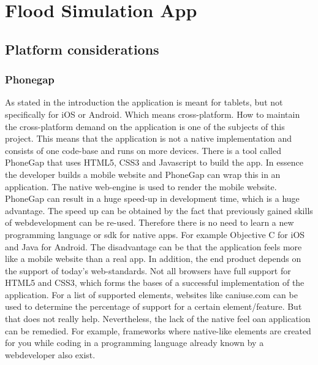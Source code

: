 \section{Flood Simulation App}
\subsection{Platform considerations}
\subsubsection{Phonegap}
As stated in the introduction the application is meant for tablets, but not specifically for iOS or Android. Which means cross-platform. How to maintain the cross-platform demand on the application is one of the subjects of this project. This means that the application is not a native implementation and consists of one code-base and runs on more devices. There is a tool called PhoneGap \cite{PhoneGap} that uses HTML5\cite{HTML5}, CSS3\cite{C3} and Javascript to build the app. In essence the developer builds a mobile website and PhoneGap can wrap this in an application. The native web-engine is used to render the mobile website. PhoneGap can result in a huge speed-up in development time, which is a huge advantage. The speed up can be obtained by the fact that previously gained skills of webdevelopment can be re-used. Therefore there is no need to learn a new programming language or sdk\cite{SDK} for native apps. For example Objective C for iOS and Java for Android. The disadvantage can be that the application feels more like a mobile website than a real app. In addition, the end product depends on the support of today's web-standards. Not all browsers have full support for HTML5 and CSS3, which forms the bases of a successful implementation of the application. For a list of supported elements, websites like caniuse.com \cite{CSS3} can be used to determine the percentage of support for a certain element/feature. But that does not really help. Nevertheless, the lack of the native feel oan application can be remedied. For example, frameworks where native-like elements are created for you while coding in a programming language already known by a webdeveloper also exist.

